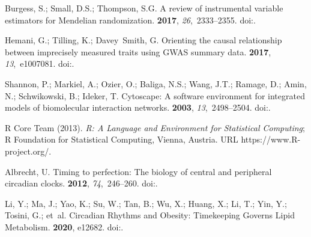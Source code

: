 \documentclass[genes,article,accept,moreauthors,pdftex]{Definitions/mdpi}
\begin{document}
\begin{thebibliography}{999}
Burgess, S.; Small, D.S.; Thompson, S.G.
\newblock A review of instrumental variable estimators for {Mendelian}
  randomization.
 {\bf 2017}, {\em
  26},~2333--2355.
\newblock 
  doi:{\href{https://doi.org/10.1177/0962280215597579}{}}.

Hemani, G.; Tilling, K.; Davey~Smith, G.
\newblock Orienting the causal relationship between imprecisely measured traits
  using {GWAS} summary data.
 {\bf 2017}, {\em 13},~e1007081.
\newblock
  doi:{\href{https://doi.org/10.1371/journal.pgen.1007081}{}}.

Shannon, P.; Markiel, A.; Ozier, O.; Baliga, N.S.; Wang, J.T.; Ramage, D.;
  Amin, N.; Schwikowski, B.; Ideker, T.
\newblock Cytoscape: A software environment for integrated models of
  biomolecular interaction networks.
 {\bf 2003}, {\em 13},~2498--2504.
\newblock
  doi:{\href{https://doi.org/10.1101/gr.1239303}{}}.

{R Core Team (2013)}.
\newblock \emph{R: {A} Language and Environment for Statistical Computing}; R Foundation for Statistical Computing, Vienna, Austria. URL https://www.R-project.org/.

Albrecht, U.
\newblock Timing to perfection: The biology of central and peripheral circadian
  clocks.
 {\bf 2012}, {\em 74},~246--260.
\newblock
  doi:{\href{https://doi.org/10.1016/j.neuron.2012.04.006}{}}.

Li, Y.; Ma, J.; Yao, K.; Su, W.; Tan, B.; Wu, X.; Huang, X.; Li, T.; Yin, Y.;
  Tosini, G.; et~al.
\newblock Circadian {Rhythms} and {Obesity}: {Timekeeping} {Governs} {Lipid}
  {Metabolism}.
 {\bf 2020}, e12682.
\newblock
  doi:{\href{https://doi.org/10.1111/jpi.12682}{}}.


\end{thebibliography}
\end{document}
